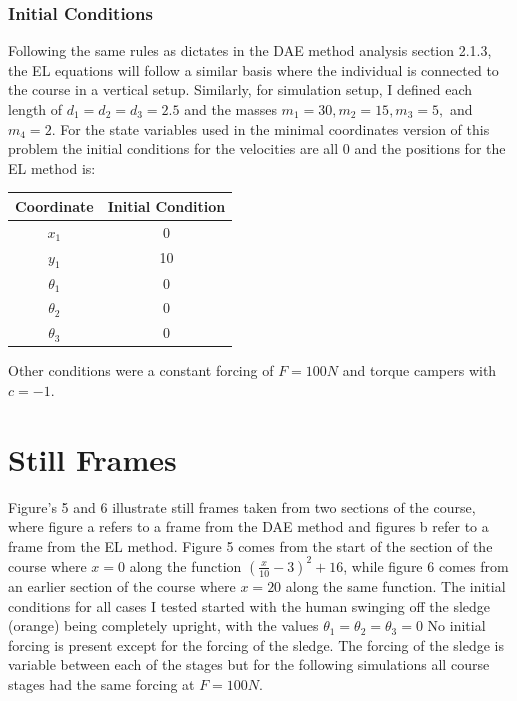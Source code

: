 \documentclass{article}
\begin{document}
\subsubsection{Initial Conditions}
Following the same rules as dictates in the DAE method analysis section 2.1.3, the EL equations will follow a similar basis where the individual is connected to the course in a vertical setup. Similarly, for simulation setup, I defined each length of $d_1=d_2=d_3=2.5$ and the masses $m_1=30, m_2=15,m_3=5,$ and $m_4=2$. For the state variables used in the minimal coordinates version of this problem the initial conditions for the velocities are all 0 and the positions for the EL method is:
\begin{center}
	\begin{tabular}{c|c}
		Coordinate&Initial Condition\\
		\hline
		$x_1$&0\\
		$y_1$&10\\
		$\theta_1$&0\\
		$\theta_2$&0\\
		$\theta_3$&0
	\end{tabular}
\end{center}
Other conditions were a constant forcing of $F = 100N$ and torque campers with $c = -1$.
\newpage
\section{Still Frames}
Figure's 5 and 6 illustrate still frames taken from two sections of the course, where figure a refers to a frame from the DAE method and figures b refer to a frame from the EL method. Figure 5 comes from the start of the section of the course where $x = 0$ along the function $(\frac{x}{10}-3)^2+16$, while figure 6 comes from an earlier section of the course where $x=20$ along the same function. The initial conditions for all cases I tested started with the human swinging off the sledge (orange) being completely upright, with the values $\theta_1 = \theta_2 = \theta_3=0$ No initial forcing is present except for the forcing of the sledge. The forcing of the sledge is variable between each of the stages but for the following simulations all course stages had the same forcing at $F = 100N$.
\end{document}
